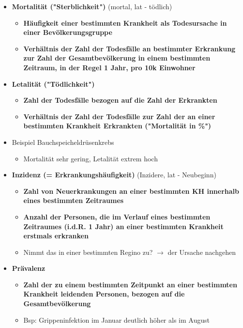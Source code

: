 \begin{itemize}
\begin{itemize}
			\end{itemize}
		\item \textbf{Mortalität ("Sterblichkeit")} (mortal, lat - tödlich)
			\begin{itemize}
				\item \textbf{Häufigkeit einer bestimmten Krankheit als Todesursache in einer Bevölkerungsgruppe}
				\item \textbf{Verhältnis der Zahl der Todesfälle an bestimmter Erkrankung zur Zahl der Gesamtbevölkerung in einem bestimmten Zeitraum, in der Regel 1 Jahr, pro 10k Einwohner}
			\end{itemize}
	\pagebreak
		\item \textbf{Letalität ("Tödlichkeit")}
			\begin{itemize}
				\item \textbf{Zahl der Todesfälle bezogen auf die Zahl der Erkrankten}
				\item \textbf{Verhältnis der Zahl der Todesfälle zur Zahl der an einer bestimmten Krankheit Erkrankten ("Mortalität in \%")}
			\end{itemize}
		\item Beispiel Bauchspeicheldrüsenkrebs
			\begin{itemize}
				\item Mortalität sehr gering, Letalität extrem hoch
			\end{itemize}
		\item \textbf{Inzidenz (= Erkrankungshäufigkeit)} (Inzidere, lat - Neubeginn)
			\begin{itemize}
				\item \textbf{Zahl von Neuerkrankungen an einer bestimmten KH innerhalb eines bestimmten Zeitraumes}
				\item \textbf{Anzahl der Personen, die im Verlauf eines bestimmten Zeitraumes (i.d.R. 1 Jahr) an einer bestimmten Krankheit erstmals erkranken}
				\item Nimmt das in einer bestimmten Regino zu? $\rightarrow$ der Ursache nachgehen
			\end{itemize}
		\item \textbf{Prävalenz}
			\begin{itemize}
				\item \textbf{Zahl der zu einem bestimmten Zeitpunkt an einer bestimmten Krankheit leidenden Personen, bezogen auf die Gesamtbevölkerung}
				\item Bsp: Grippeninfektion im Januar deutlich höher als im August
			\end{itemize}
	\end{itemize}

